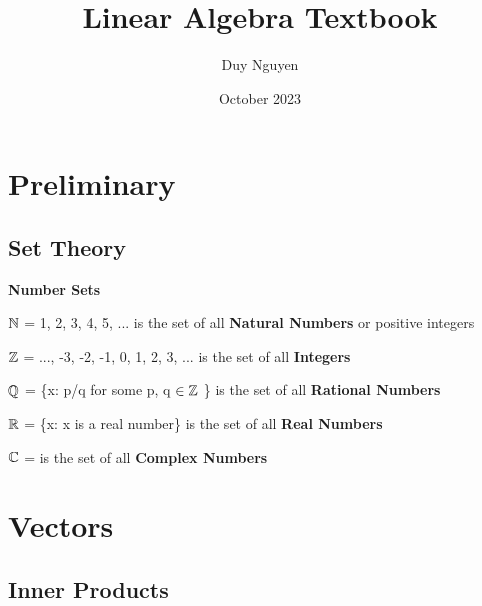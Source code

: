 \documentclass[12pt]{article}
\title{Linear Algebra Textbook}
\author{Duy Nguyen}
\date{October 2023}
\begin{document}
\tableofcontents


\section{Preliminary}

\subsection{Set Theory}
\begin{defin}{\textbf{Number Sets}}

$\mathbb{N}$ = {1, 2, 3, 4, 5, ...} is the set of all \textbf{Natural Numbers} or positive integers

$\mathbb{Z}$ = {..., -3, -2, -1, 0, 1, 2, 3, ...} is the set of all \textbf{Integers}

$\mathbb{Q}$ = \{x: p/q for some p, q $\in \mathbb{Z}$ \} is the set of all \textbf{Rational Numbers}

$\mathbb{R}$ = \{x: x is a real number\} is the set of all \textbf{Real Numbers}

$\mathbb{C}$ = is the set of all \textbf{Complex Numbers}
\end{defin}

\section{Vectors}

\subsection{Inner Products}
\end{document}
